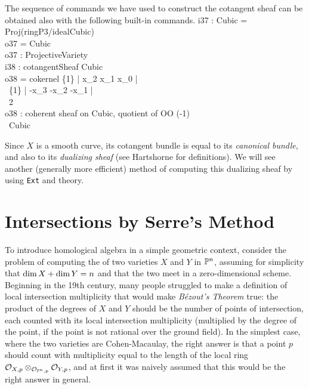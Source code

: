 The sequence of commands we have used to construct the
cotangent sheaf can be obtained also with
the following built-in commands.
\beginOutput
i37 : Cubic = Proj(ringP3/idealCubic)\\
\emptyLine
o37 = Cubic\\
\emptyLine
o37 : ProjectiveVariety\\
\endOutput
\beginOutput
i38 : cotangentSheaf Cubic\\
\emptyLine
o38 = cokernel \{1\} | x_2  x_1  x_0  |\\
\               \{1\} | -x_3 -x_2 -x_1 |\\
\emptyLine
\                                                  2\\
o38 : coherent sheaf on Cubic, quotient of OO      (-1)\\
\                                             Cubic\\
\endOutput


Since $X$ is a smooth curve, its cotangent bundle is equal
to its {\it canonical bundle}, and also to its {\it dualizing sheaf} 
(see Hartshorne \cite[sections II.8 and III.7]{Hartshorne} 
{}for definitions).
We will
see another (generally more efficient) method of computing this
dualizing sheaf by using {\tt Ext} and  theory.

\goodbreak

\section{Intersections by Serre's Method}

%
To introduce homological algebra in a simple geometric context,
consider the problem of computing the 
of two varieties $X$ and $Y$ in $\P^n$, assuming for simplicity
that $\mathop{\rm dim} X +\mathop{\rm dim} Y = n$ and that the two
meet in a zero-dimensional scheme. Beginning in the
19th century, many people struggled to make a definition of
local intersection multiplicity
that would make {\it B\'ezout's Theorem\/} true: the product 
of the degrees of $X$ and $Y$ should be the number of points
of intersection, each counted with its local intersection multiplicity
(multiplied by the degree of the point, if the point is not
rational over the ground field).
In the simplest case, where the two varieties are Cohen-Macaulay,
the right answer is that a point $p$ should count with multiplicity
equal to the length of the local ring 
$\cO_{X,p}\otimes_{\cO_{\P^n,p}} \cO_{Y,p}$,
and at first it was naively assumed that this would be the right answer
in general. 

